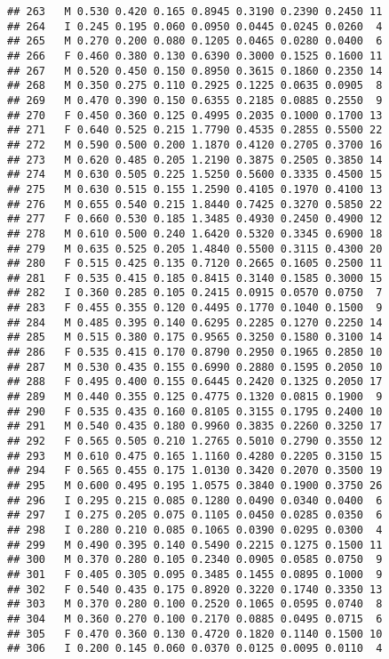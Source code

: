 \documentclass[
]{article}
\begin{document}
\begin{verbatim}
## 263   M 0.530 0.420 0.165 0.8945 0.3190 0.2390 0.2450 11
## 264   I 0.245 0.195 0.060 0.0950 0.0445 0.0245 0.0260  4
## 265   M 0.270 0.200 0.080 0.1205 0.0465 0.0280 0.0400  6
## 266   F 0.460 0.380 0.130 0.6390 0.3000 0.1525 0.1600 11
## 267   M 0.520 0.450 0.150 0.8950 0.3615 0.1860 0.2350 14
## 268   M 0.350 0.275 0.110 0.2925 0.1225 0.0635 0.0905  8
## 269   M 0.470 0.390 0.150 0.6355 0.2185 0.0885 0.2550  9
## 270   F 0.450 0.360 0.125 0.4995 0.2035 0.1000 0.1700 13
## 271   F 0.640 0.525 0.215 1.7790 0.4535 0.2855 0.5500 22
## 272   M 0.590 0.500 0.200 1.1870 0.4120 0.2705 0.3700 16
## 273   M 0.620 0.485 0.205 1.2190 0.3875 0.2505 0.3850 14
## 274   M 0.630 0.505 0.225 1.5250 0.5600 0.3335 0.4500 15
## 275   M 0.630 0.515 0.155 1.2590 0.4105 0.1970 0.4100 13
## 276   M 0.655 0.540 0.215 1.8440 0.7425 0.3270 0.5850 22
## 277   F 0.660 0.530 0.185 1.3485 0.4930 0.2450 0.4900 12
## 278   M 0.610 0.500 0.240 1.6420 0.5320 0.3345 0.6900 18
## 279   M 0.635 0.525 0.205 1.4840 0.5500 0.3115 0.4300 20
## 280   F 0.515 0.425 0.135 0.7120 0.2665 0.1605 0.2500 11
## 281   F 0.535 0.415 0.185 0.8415 0.3140 0.1585 0.3000 15
## 282   I 0.360 0.285 0.105 0.2415 0.0915 0.0570 0.0750  7
## 283   F 0.455 0.355 0.120 0.4495 0.1770 0.1040 0.1500  9
## 284   M 0.485 0.395 0.140 0.6295 0.2285 0.1270 0.2250 14
## 285   M 0.515 0.380 0.175 0.9565 0.3250 0.1580 0.3100 14
## 286   F 0.535 0.415 0.170 0.8790 0.2950 0.1965 0.2850 10
## 287   M 0.530 0.435 0.155 0.6990 0.2880 0.1595 0.2050 10
## 288   F 0.495 0.400 0.155 0.6445 0.2420 0.1325 0.2050 17
## 289   M 0.440 0.355 0.125 0.4775 0.1320 0.0815 0.1900  9
## 290   F 0.535 0.435 0.160 0.8105 0.3155 0.1795 0.2400 10
## 291   M 0.540 0.435 0.180 0.9960 0.3835 0.2260 0.3250 17
## 292   F 0.565 0.505 0.210 1.2765 0.5010 0.2790 0.3550 12
## 293   M 0.610 0.475 0.165 1.1160 0.4280 0.2205 0.3150 15
## 294   F 0.565 0.455 0.175 1.0130 0.3420 0.2070 0.3500 19
## 295   M 0.600 0.495 0.195 1.0575 0.3840 0.1900 0.3750 26
## 296   I 0.295 0.215 0.085 0.1280 0.0490 0.0340 0.0400  6
## 297   I 0.275 0.205 0.075 0.1105 0.0450 0.0285 0.0350  6
## 298   I 0.280 0.210 0.085 0.1065 0.0390 0.0295 0.0300  4
## 299   M 0.490 0.395 0.140 0.5490 0.2215 0.1275 0.1500 11
## 300   M 0.370 0.280 0.105 0.2340 0.0905 0.0585 0.0750  9
## 301   F 0.405 0.305 0.095 0.3485 0.1455 0.0895 0.1000  9
## 302   F 0.540 0.435 0.175 0.8920 0.3220 0.1740 0.3350 13
## 303   M 0.370 0.280 0.100 0.2520 0.1065 0.0595 0.0740  8
## 304   M 0.360 0.270 0.100 0.2170 0.0885 0.0495 0.0715  6
## 305   F 0.470 0.360 0.130 0.4720 0.1820 0.1140 0.1500 10
## 306   I 0.200 0.145 0.060 0.0370 0.0125 0.0095 0.0110  4

\end{verbatim}
\end{document}
